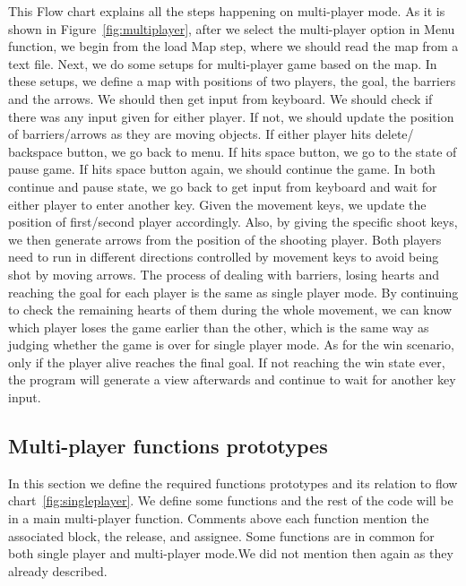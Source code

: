 This Flow chart explains all the steps happening on multi-player mode. 
As it is shown in Figure~\ref{fig:multiplayer}, after we select the multi-player option in Menu function, we begin from the load Map step, where we should read the map from a text file. 
Next, we do some setups for multi-player game based on the map. 
In these setups, we define a map with positions of two players, the goal, the barriers and the arrows. 
We should then get input from keyboard. 
We should check if there was any input given for either player. 
If not, we should update the position of barriers/arrows as they are moving objects. 
If either player hits delete/ backspace button, we go back to menu. 
If hits space button, we go to the state of pause game. 
If hits space button again, we should continue the game. 
In both continue and pause state, we go back to get input from keyboard and wait for either player to enter another key. 
Given the movement keys, we update the position of first/second player accordingly. 
Also, by giving the specific shoot keys, we then generate arrows from the position of the shooting player. 
Both players need to run in different directions controlled by movement keys to avoid being shot by moving arrows. 
The process of dealing with barriers, losing hearts and reaching the goal for each player is the same as single player mode. 
By continuing to check the remaining hearts of them during the whole movement, we can know which player loses the game earlier than the other, which is the same way as judging whether the game is over for single player mode. 
As for the win scenario, only if the player alive reaches the final goal. 
If not reaching the win state ever, the program will generate a view afterwards and continue to wait for another key input.

\subsection{Multi-player functions prototypes}

In this section we define the required functions prototypes and its relation to flow chart~\ref{fig:singleplayer}. We define some functions and the rest of the code will be in a main multi-player function. Comments above each function mention the associated block, the release, and assignee. Some functions are in common for both single player and multi-player mode.We did not mention then again as they already described.


